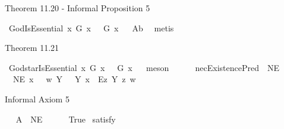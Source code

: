 \begin{isabellebody}
\begin{isamarkuptext}%
Theorem 11.20 - Informal Proposition 5%
\end{isamarkuptext}\isamarkuptrue%
\isamarkupfalse%
\ GodIsEssential{\isacharcolon}\ {\isachardoublequoteopen}{\isasymlfloor}\isactrlbold {\isasymforall}x{\isachardot}\ G\ x\ \isactrlbold {\isasymrightarrow}\ {\isacharparenleft}{\isacharparenleft}{\isasymE}\ {\isasymdown}G{\isacharparenright}\ x{\isacharparenright}{\isasymrfloor}{\isachardoublequoteclose}%
\ %
%
\isamarkupfalse%
\ A{}b\ \isamarkupfalse%
\ metis%
%
%
%
\begin{isamarkuptext}%
Theorem 11.21%
\end{isamarkuptext}\isamarkuptrue%
\isamarkupfalse%
\ God{\isacharunderscore}starIsEssential{\isacharcolon}\ {\isachardoublequoteopen}{\isasymlfloor}\isactrlbold {\isasymforall}x{\isachardot}\ G{\isacharasterisk}\ x\ \isactrlbold {\isasymrightarrow}\ {\isacharparenleft}{\isacharparenleft}{\isasymE}\ {\isasymdown}G{\isacharasterisk}{\isacharparenright}\ x{\isacharparenright}{\isasymrfloor}{\isachardoublequoteclose}%
\ %
%
\isamarkupfalse%
\ meson%
%
%
\isanewline
\ \ \ \ \isanewline
{}\isamarkupfalse%
\ necExistencePred{\isacharcolon}{\isacharcolon}\ {\isachardoublequoteopen}{\isasymup}{\isasymlangle}{\isasymzero}{\isasymrangle}{\isachardoublequoteclose}\ {\isacharparenleft}{\isachardoublequoteopen}NE{\isachardoublequoteclose}{\isacharparenright}\ \isanewline
\ \ {\isachardoublequoteopen}NE\ x\ \ {\isasymequiv}\ {\isasymlambda}w{\isachardot}\ {\isacharparenleft}\isactrlbold {\isasymforall}Y{\isachardot}\ \ {\isasymE}\ Y\ x\ \isactrlbold {\isasymrightarrow}\ \isactrlbold {\isasymbox}{\isacharparenleft}\isactrlbold {\isasymexists}\isactrlsup Ez{\isachardot}\ {\isasymlparr}Y\ z{\isasymrparr}{\isacharparenright}{\isacharparenright}\ w{\isachardoublequoteclose}%
\begin{isamarkuptext}%
Informal Axiom 5%
\end{isamarkuptext}\isamarkuptrue%
\isamarkupfalse%
\ \isanewline
\ A{}{\isacharcolon}\ {\isachardoublequoteopen}{\isasymlfloor}{\isasymP}\ {\isasymdown}NE{\isasymrfloor}{\isachardoublequoteclose}\isanewline
\ \ \ \ \isanewline
{}\isamarkupfalse%
\ True\ \isamarkupfalse%
{\isacharbrackleft}satisfy{\isacharbrackright}%
\ %
%
\isamarkupfalse%

\end{isabellebody}
